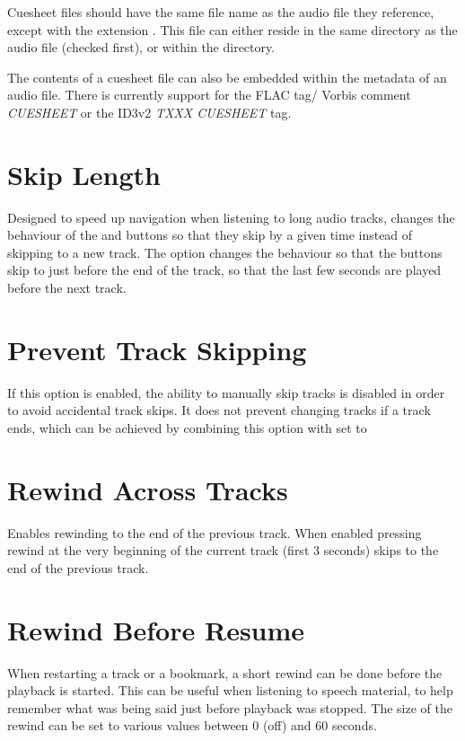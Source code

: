   Cuesheet files should have the same file name as the audio file they
  reference, except with the extension . This file can either
  reside in the same directory as the audio file (checked first), or within the
   directory.
  
  The contents of a cuesheet file can also be embedded within the metadata of
  an audio file. There is currently support for the FLAC tag/ Vorbis comment
  \emph{CUESHEET} or the ID3v2 \emph{TXXX CUESHEET} tag.
  
\section{Skip Length}
  Designed to speed up navigation when listening to long audio tracks,
   changes the behaviour of
  the \ActionWpsSkipPrev{} and \ActionWpsSkipNext{} buttons so that they skip
  by a given time instead of skipping to a new track.
  The  option changes the behaviour so that the buttons
  skip to just before the end of the track, so that the last few seconds are
  played before the next track.

\section{Prevent Track Skipping}
  If this option is enabled, the ability to manually skip tracks is disabled
  in order to avoid accidental track skips. It does not prevent changing tracks
  if a track ends, which can be achieved by combining this option with
   set to 

\section{Rewind Across Tracks}
  Enables rewinding to the end of the previous track. When enabled pressing rewind
  at the very beginning of the current track (first 3 seconds) skips to the end of
  the previous track.

\section{Rewind Before Resume}
  When restarting a track or a bookmark, a short rewind can be done before the
  playback is started. This can be useful when listening to speech material,
  to help remember what was being said just before playback was stopped.
  The size of the rewind can be set to various values between 0 (off) and
  60 seconds.

